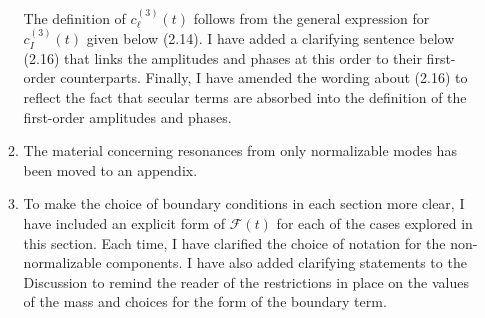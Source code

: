 \documentclass[11pt,letterpaper]{article}
\newcommand{\mc}{\mathcal}
\begin{document}
\begin{enumerate}
\begin{enumerate}
        The definition of $c^{(3)}_\ell (t)$ follows from the general expression for $c_I^{(3)}(t)$ given below (2.14). I have added a clarifying sentence below (2.16) that links the amplitudes and phases at this order to their first-order counterparts.
        Finally, I have amended the wording about (2.16) to reflect the fact that secular terms are absorbed into the definition of the first-order amplitudes and phases. 
        \item The material concerning resonances from only normalizable modes has been moved to an appendix.
        \item To make the choice of boundary conditions in each section more clear, I have included an explicit form of $\mc F(t)$ for each of the cases explored in this section. Each time, I have clarified the choice of notation for the non-normalizable components. I have also added clarifying statements to the Discussion to remind the reader of the restrictions in place on the values of the mass and choices for the form of the boundary term.
        

\end{enumerate}
\end{enumerate}
\end{document}
